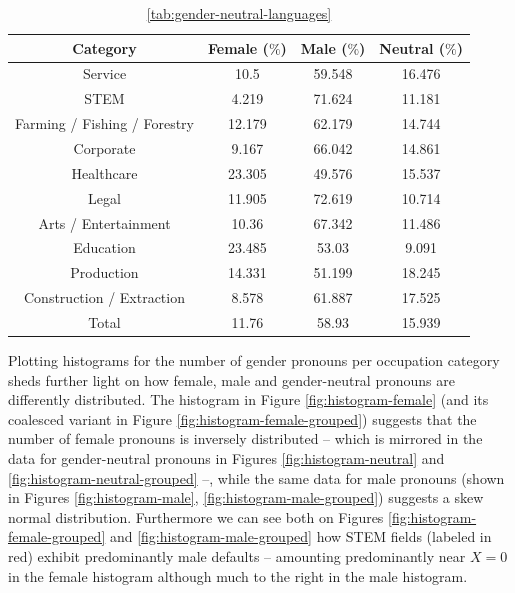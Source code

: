\documentclass[fleqn,10pt]{article}
\begin{document}
\begin{table}[H]
\centering
\small{
	\begin{tabular}{|c|c|c|c|}
	\hline
	Category 								& Female ($\%$)			& Male ($\%$)			& Neutral ($\%$)	\\ \hline
	\hline
	Service & 10.5 & 59.548 & 16.476 \\ \hline
	STEM & 4.219 & 71.624 & 11.181 \\ \hline
	Farming / Fishing / Forestry & 12.179 & 62.179 & 14.744 \\ \hline
	Corporate & 9.167 & 66.042 & 14.861 \\ \hline
	Healthcare & 23.305 & 49.576 & 15.537 \\ \hline
	Legal & 11.905 & 72.619 & 10.714 \\ \hline
	Arts / Entertainment & 10.36 & 67.342 & 11.486 \\ \hline
	Education & 23.485 & 53.03 & 9.091 \\ \hline
	Production & 14.331 & 51.199 & 18.245 \\ \hline
	Construction / Extraction & 8.578 & 61.887 & 17.525 \\ \hline \hline
	Total & 11.76 & 58.93 & 15.939 \\ \hline

	\end{tabular}
	}
    \caption{ \ref{tab:gender-neutral-languages}}
	\label{tab:gender-by-category-grouped}
\end{table}

Plotting histograms for the number of gender pronouns per occupation category sheds further light on how female, male and gender-neutral pronouns are differently distributed. The histogram in Figure \ref{fig:histogram-female} (and its coalesced variant in Figure \ref{fig:histogram-female-grouped}) suggests that the number of female pronouns is inversely distributed -- which is mirrored in the data for gender-neutral pronouns in Figures \ref{fig:histogram-neutral} and \ref{fig:histogram-neutral-grouped} --, while the same data for male pronouns (shown in Figures \ref{fig:histogram-male}, \ref{fig:histogram-male-grouped}) suggests a skew normal distribution. Furthermore we can see both on Figures \ref{fig:histogram-female-grouped} and \ref{fig:histogram-male-grouped} how STEM fields (labeled in red) exhibit predominantly male defaults -- amounting predominantly near $X = 0$ in the female histogram although much to the right in the male histogram.
\end{document}
